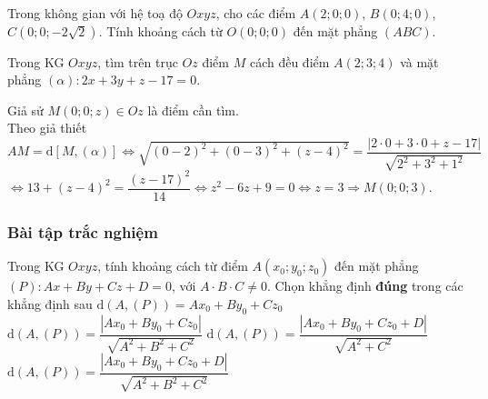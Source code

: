 \begin{vd}%
	Trong không gian với hệ toạ độ $Oxyz$, cho các điểm $A(2;0;0)$, $B(0;4;0)$, $C(0;0;-2\sqrt{2})$. Tính khoảng cách từ $O(0;0;0)$ đến mặt phẳng $(ABC)$.

\end{vd}
\begin{vd}%
	Trong KG $Oxyz$, tìm trên trục $Oz$ điểm $M$ cách đều điểm $A(2;3;4)$ và mặt phẳng $(\alpha )\colon 2x+3y+z-17=0.$

	\loigiai
	{Giả sử $M(0;0;z )\in Oz$ là điểm cần tìm.\\
		Theo giả thiết $AM=\mathrm{d}\left[ M,(\alpha ) \right]\Leftrightarrow \sqrt{(0-2 )^2+(0-3 )^2+(z-4 )^2}=\dfrac{\left| 2\cdot0+3\cdot0+z-17 \right|}{\sqrt{2^2+3^2+1^2}}$\\
		$\Leftrightarrow 13+(z-4 )^2=\dfrac{(z-17 )^2}{14}\Leftrightarrow z^2-6z+9=0\Leftrightarrow z=3\Rightarrow M(0;0;3)$.}
\end{vd}
\subsubsection{Bài tập trắc nghiệm}
\begin{ex}%
	Trong KG $Oxyz$, tính khoảng cách từ điểm  $A\left(x_0;y_0;z_0\right)$ đến mặt phẳng $(P)\colon Ax+By+Cz+D=0$, với $A\cdot B\cdot C\ne 0$. Chọn khẳng định \textbf{đúng} trong các khẳng định sau
	\choice
	{$\mathrm{d}\left(A,(P)\right)=Ax_0+By_0+Cz_0$}
	{$\mathrm{d}\left(A,(P)\right)=\dfrac{\left|{Ax_0+By_0+Cz_0}\right|}{\sqrt{A^2+B^2+C^2}}$}
	{$\mathrm{d}\left(A,(P)\right)=\dfrac{\left|{Ax_0+By_0+Cz_0+D}\right|}{\sqrt{A^2+C^2}}$}
	{\True $\mathrm{d}\left(A,(P)\right)=\dfrac{\left|{Ax_0+By_0+Cz_0+D}\right|}{\sqrt{A^2+B^2+C^2}}$}
\end{ex}

